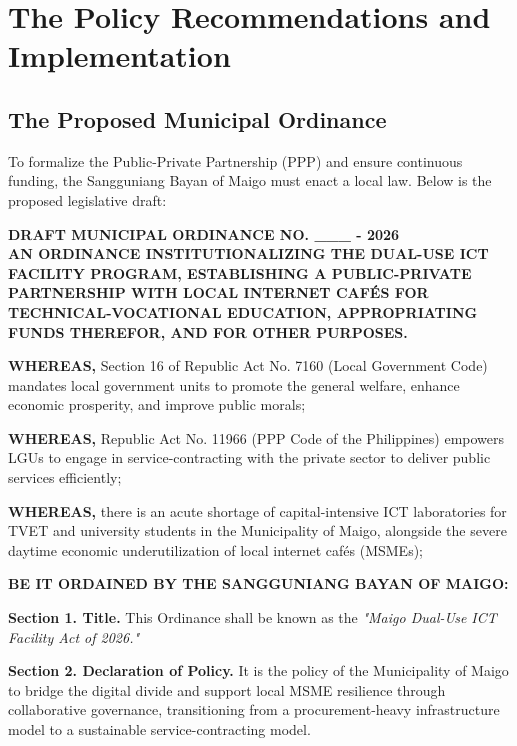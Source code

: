 \section{The Policy Recommendations and Implementation}

\subsection{The Proposed Municipal Ordinance}
To formalize the Public-Private Partnership (PPP) and ensure continuous funding, the Sangguniang Bayan of Maigo must enact a local law. Below is the proposed legislative draft:

\vspace{1em}
\begin{center}
    \textbf{DRAFT MUNICIPAL ORDINANCE NO. \_\_\_ - 2026} \\
    \vspace{0.5em}
    \textbf{AN ORDINANCE INSTITUTIONALIZING THE DUAL-USE ICT FACILITY PROGRAM, ESTABLISHING A PUBLIC-PRIVATE PARTNERSHIP WITH LOCAL INTERNET CAFÉS FOR TECHNICAL-VOCATIONAL EDUCATION, APPROPRIATING FUNDS THEREFOR, AND FOR OTHER PURPOSES.}
\end{center}

\vspace{0.5em}
\noindent \textbf{WHEREAS,} Section 16 of Republic Act No. 7160 (Local Government Code) mandates local government units to promote the general welfare, enhance economic prosperity, and improve public morals;

\noindent \textbf{WHEREAS,} Republic Act No. 11966 (PPP Code of the Philippines) empowers LGUs to engage in service-contracting with the private sector to deliver public services efficiently;

\noindent \textbf{WHEREAS,} there is an acute shortage of capital-intensive ICT laboratories for TVET and university students in the Municipality of Maigo, alongside the severe daytime economic underutilization of local internet cafés (MSMEs);

\noindent \textbf{BE IT ORDAINED BY THE SANGGUNIANG BAYAN OF MAIGO:}

\vspace{0.5em}
\noindent \textbf{Section 1. Title.} This Ordinance shall be known as the \textit{"Maigo Dual-Use ICT Facility Act of 2026."}

\noindent \textbf{Section 2. Declaration of Policy.} It is the policy of the Municipality of Maigo to bridge the digital divide and support local MSME resilience through collaborative governance, transitioning from a procurement-heavy infrastructure model to a sustainable service-contracting model.

